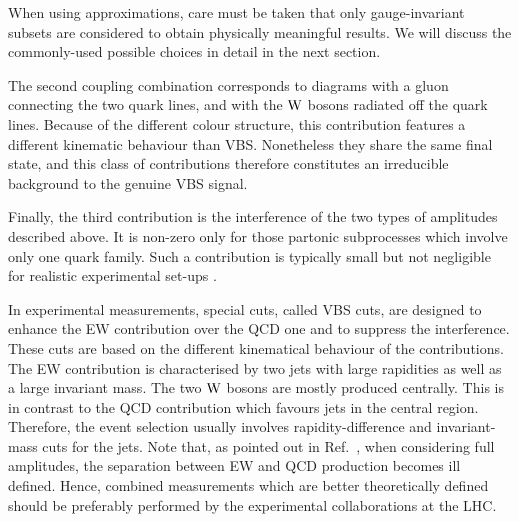 When using approximations, care must be taken that only gauge-invariant subsets are considered to obtain physically meaningful results. We will discuss the commonly-used possible choices in detail in the next section.

The second coupling combination corresponds to diagrams with a gluon connecting the two quark lines, and with the $\text{W}$ bosons 
radiated off the quark lines. Because of the different colour structure, this contribution features a 
different kinematic behaviour than VBS. Nonetheless they share the same final state, and this class of contributions therefore constitutes an irreducible background to the genuine VBS signal.

Finally, the third contribution is the interference of the two types of amplitudes described above.
It is non-zero only for those partonic subprocesses which involve only one quark family.
Such a contribution is typically small but not negligible for realistic experimental set-ups \cite{Biedermann:2017bss}.

In experimental measurements, special cuts, called VBS cuts, are designed to enhance the EW contribution over the QCD one and to suppress the interference.
These cuts are based on the different kinematical behaviour of the contributions.
The EW contribution is characterised by two jets with large rapidities as well as a large invariant mass.
The two $\text{W}$ bosons are mostly produced centrally.
This is in contrast to the QCD contribution which favours jets in the central region.
Therefore, the event selection usually involves rapidity-difference and invariant-mass cuts for the jets.
Note that, as pointed out in Ref.~\cite{Biedermann:2017bss}, when considering full amplitudes, the separation between EW and QCD production becomes ill
defined.
Hence, combined measurements which are better theoretically defined should be preferably performed by the experimental collaborations at the LHC.


